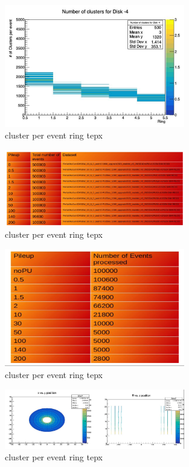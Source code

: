 \begin{figure}[!htp]
\centering
\includegraphics[width=0.7\textwidth]{ashish_thesis/cluster_ring.png}
\caption{%
  cluster per event ring tepx 
}
\label{fig:cluster_ring}
\end{figure}


\begin{figure}[!htp]
\centering
\includegraphics[width=0.7\textwidth]{ashish_thesis/tepx_dataset.png}
\caption{%
  cluster per event ring tepx 
}
\label{fig:cluster_ring}
\end{figure}


\begin{figure}[!htp]
\centering
\includegraphics[width=0.7\textwidth]{ashish_thesis/tepx_events_processed.png}
\caption{%
  cluster per event ring tepx 
}
\label{fig:cluster_ring}
\end{figure}


\begin{figure}[!htp]
\centering
\includegraphics[width=0.7\textwidth]{ashish_thesis/tepx_cluster_pu100.png}
\caption{%
  cluster per event ring tepx 
}
\label{fig:cluster_ring}
\end{figure}

